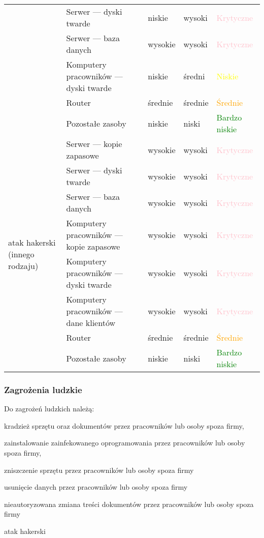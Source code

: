 \begin{landscape}
\begin{longtable}[!ht]{|m{4cm}|m{6cm}|m{4.5cm}|m{3cm}|m{3cm}|}
 	\hline
 	\newpage
 	\hline
 	\multirow{4}{4cm}{atak DDoS}
 		& Serwer --- dyski twarde & niskie  & wysoki & \textcolor{pink}{Krytyczne} \\ \cline{2-5} 
 		& Serwer --- baza danych & wysokie & wysoki & \textcolor{pink}{Krytyczne} \\ \cline{2-5} 
 		& Komputery pracowników --- dyski twarde  & niskie  & średni & \textcolor{yellow}{Niskie} \\ \cline{2-5} 
 		& Router & średnie  & średnie & \textcolor{orange}{Średnie} \\ \cline{2-5} 
 		& Pozostałe zasoby & niskie  & niski & \textcolor{green}{Bardzo niskie} \\ 
 		\hline
 	\multirow{8}{4cm}{atak hakerski \linebreak (innego rodzaju)}
 		& Serwer --- kopie zapasowe  & wysokie & wysoki & \textcolor{pink}{Krytyczne} \\ \cline{2-5} 
 		& Serwer --- dyski twarde & wysokie  & wysoki & \textcolor{pink}{Krytyczne} \\ \cline{2-5} 
 		& Serwer --- baza danych & wysokie & wysoki & \textcolor{pink}{Krytyczne} \\ \cline{2-5} 
 		& Komputery pracowników --- kopie zapasowe & wysokie & wysoki & \textcolor{pink}{Krytyczne} \\ \cline{2-5} 
 		& Komputery pracowników --- dyski twarde  & wysokie  & wysoki & \textcolor{pink}{Krytyczne} \\ \cline{2-5} 
 		& Komputery pracowników --- dane klientów & wysokie & wysoki & \textcolor{pink}{Krytyczne} \\ \cline{2-5} 
 		& Router & średnie  & średnie & \textcolor{orange}{Średnie} \\ \cline{2-5} 
 		& Pozostałe zasoby & niskie  & niski & \textcolor{green}{Bardzo niskie} \\ 
 	\hline
\end{longtable}
\end{landscape}

\subsubsection{Zagrożenia ludzkie}
Do zagrożeń ludzkich należą: 
\begin{itemize*}
	\item kradzież sprzętu oraz dokumentów przez pracowników lub osoby spoza firmy,
	\item zainstalowanie zainfekowanego oprogramowania przez pracowników lub osoby spoza firmy,
	\item zniszczenie sprzętu przez pracowników lub osoby spoza firmy
	\item usunięcie danych przez pracowników lub osoby spoza firmy
	\item nieautoryzowana zmiana treści dokumentów przez pracowników lub osoby spoza firmy
	\item atak hakerski 
\end{itemize*}

